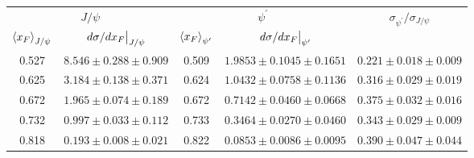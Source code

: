 \begin{tabular}{cc|cc|c}
\hline
\multicolumn{2}{c|}{$J/\psi$} &
  \multicolumn{2}{c|}{$\psi^{\prime}$} &
  \multirow{2}{*}{$\sigma_{\psi^\prime}/\sigma_{J/\psi}$} \\ \cline{1-4}
$\expval{x_F}_{J/\psi}$ &
  $\eval{d\sigma/dx_F}_{J/\psi}$ &
  $\expval{x_F}_{\psi^\prime}$ &
  $\eval{d\sigma/dx_F}_{\psi^\prime}$ &
   \\ \hline
\multicolumn{1}{c|}{0.527} &
  $8.546\pm0.288\pm0.909$ &
  \multicolumn{1}{c|}{0.509} &
  $1.9853\pm0.1045\pm0.1651$ &
  $0.221\pm0.018\pm0.009$ \\
\multicolumn{1}{c|}{0.625} &
  $3.184\pm0.138\pm0.371$ &
  \multicolumn{1}{c|}{0.624} &
  $1.0432\pm0.0758\pm0.1136$ &
  $0.316\pm0.029\pm0.019$ \\
\multicolumn{1}{c|}{0.672} &
  $1.965\pm0.074\pm0.189$ &
  \multicolumn{1}{c|}{0.672} &
  $0.7142\pm0.0460\pm0.0668$ &
  $0.375\pm0.032\pm0.016$ \\
\multicolumn{1}{c|}{0.732} &
  $0.997\pm0.033\pm0.112$ &
  \multicolumn{1}{c|}{0.733} &
  $0.3464\pm0.0270\pm0.0460$ &
  $0.343\pm0.029\pm0.009$ \\
\multicolumn{1}{c|}{0.818} &
  $0.193\pm0.008\pm0.021$ &
  \multicolumn{1}{c|}{0.822} &
  $0.0853\pm0.0086\pm0.0095$ &
  $0.390\pm0.047\pm0.044$ \\ \hline
\end{tabular}
